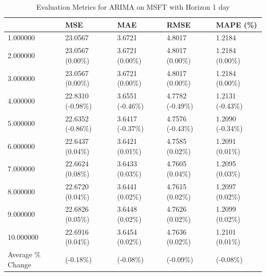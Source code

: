 \begin{table}
\caption{Evaluation Metrics for ARIMA on MSFT with Horizon 1 day}
\label{tab:arima_MSFT_h1_metrics}
\begin{tabular}{lllll}
\toprule
 & MSE & MAE & RMSE & MAPE (\%) \\
\midrule
1.000000 & 23.0567 & 3.6721 & 4.8017 & 1.2184 \\
2.000000 & 23.0567 (0.00\%) & 3.6721 (0.00\%) & 4.8017 (0.00\%) & 1.2184 (0.00\%) \\
3.000000 & 23.0567 (0.00\%) & 3.6721 (0.00\%) & 4.8017 (0.00\%) & 1.2184 (0.00\%) \\
4.000000 & 22.8310 (-0.98\%) & 3.6551 (-0.46\%) & 4.7782 (-0.49\%) & 1.2131 (-0.43\%) \\
5.000000 & 22.6352 (-0.86\%) & 3.6417 (-0.37\%) & 4.7576 (-0.43\%) & 1.2090 (-0.34\%) \\
6.000000 & 22.6437 (0.04\%) & 3.6421 (0.01\%) & 4.7585 (0.02\%) & 1.2091 (0.01\%) \\
7.000000 & 22.6624 (0.08\%) & 3.6433 (0.03\%) & 4.7605 (0.04\%) & 1.2095 (0.03\%) \\
8.000000 & 22.6720 (0.04\%) & 3.6441 (0.02\%) & 4.7615 (0.02\%) & 1.2097 (0.02\%) \\
9.000000 & 22.6826 (0.05\%) & 3.6448 (0.02\%) & 4.7626 (0.02\%) & 1.2099 (0.02\%) \\
10.000000 & 22.6916 (0.04\%) & 3.6454 (0.02\%) & 4.7636 (0.02\%) & 1.2101 (0.01\%) \\
Average \% Change & (-0.18\%) & (-0.08\%) & (-0.09\%) & (-0.08\%) \\
\bottomrule
\end{tabular}
\end{table}
